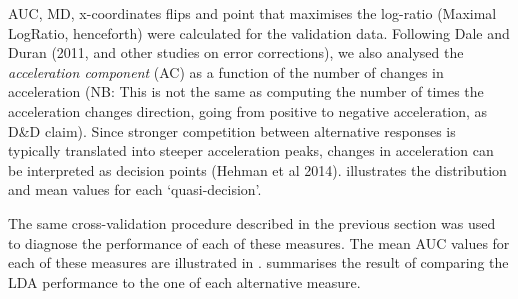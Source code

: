 \documentclass{article}
\begin{document}
AUC, MD, x-coordinates flips and point that maximises the log-ratio (Maximal LogRatio, henceforth) were calculated for the validation data. 
Following Dale and Duran (2011, and other studies on error corrections), we also analysed the \emph{acceleration component} (AC) as a function of the number of changes in acceleration (NB: This is not the same as computing the number of times the acceleration changes direction, going from positive to negative acceleration, as D\&D claim). 
Since stronger competition between alternative responses is typically translated into steeper acceleration peaks, changes in acceleration can be interpreted as decision points (Hehman et al 2014).   
 illustrates the distribution and mean values for each `quasi-decision'.

The same cross-validation procedure described in the previous section was used to diagnose the performance of each of these measures. The mean AUC values for each of these measures are illustrated in .  summarises the result of comparing the LDA performance to the one of each alternative measure. 
\end{document}
